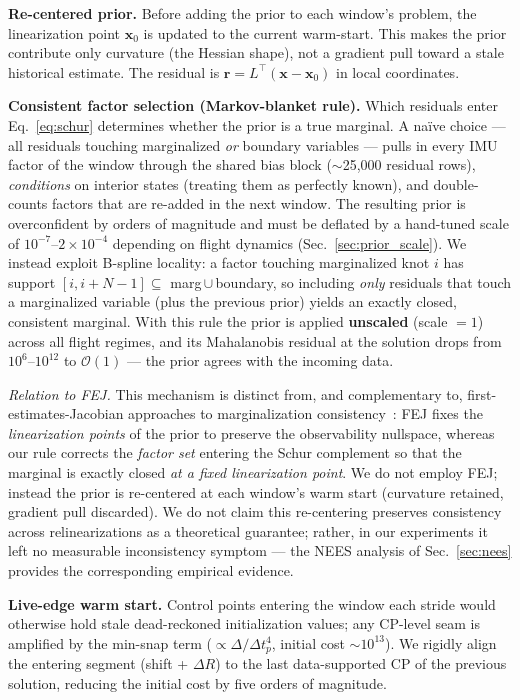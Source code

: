 \documentclass[conference]{IEEEtran}
\begin{document}
\textbf{Re-centered prior.}
Before adding the prior to each window's problem, the linearization
point $\mathbf{x}_0$ is updated to the current warm-start.  This
makes the prior contribute only curvature (the Hessian shape), not a
gradient pull toward a stale historical estimate.  The residual is
$\mathbf{r} = L^{\top}(\mathbf{x} - \mathbf{x}_0)$ in local
coordinates.

\textbf{Consistent factor selection (Markov-blanket rule).}
Which residuals enter Eq.~\eqref{eq:schur} determines whether the
prior is a true marginal.  A na\"ive choice --- all residuals touching
marginalized \emph{or} boundary variables --- pulls in every IMU factor
of the window through the shared bias block ($\sim$25{,}000 residual
rows), \emph{conditions} on interior states (treating them as perfectly
known), and double-counts factors that are re-added in the next window.
The resulting prior is overconfident by orders of magnitude and must be
deflated by a hand-tuned scale of $10^{-7}$--$2{\times}10^{-4}$
depending on flight dynamics (Sec.~\ref{sec:prior_scale}).
We instead exploit B-spline locality: a factor touching marginalized
knot $i$ has support $[i, i{+}N{-}1] \subseteq$
marg\,$\cup$\,boundary, so including \emph{only} residuals that touch a
marginalized variable (plus the previous prior) yields an exactly
closed, consistent marginal.  With this rule the prior is applied
\textbf{unscaled} (scale $=1$) across all flight regimes, and its
Mahalanobis residual at the solution drops from $10^{6}$--$10^{12}$
to $\mathcal{O}(1)$ --- the prior agrees with the incoming data.

\emph{Relation to FEJ.}  This mechanism is distinct from, and
complementary to, first-estimates-Jacobian approaches to
marginalization consistency~\cite{dongsi2012consistency}: FEJ fixes
the \emph{linearization points} of the prior to preserve the
observability nullspace, whereas our rule corrects the
\emph{factor set} entering the Schur complement so that the marginal
is exactly closed \emph{at a fixed linearization point}.  We do not
employ FEJ; instead the prior is re-centered at each window's warm
start (curvature retained, gradient pull discarded).  We do not claim
this re-centering preserves consistency across relinearizations as a
theoretical guarantee; rather, in our experiments it left no measurable
inconsistency symptom --- the NEES analysis of
Sec.~\ref{sec:nees} provides the corresponding empirical evidence.

\textbf{Live-edge warm start.}
Control points entering the window each stride would otherwise hold
stale dead-reckoned initialization values; any CP-level seam is
amplified by the min-snap term ($\propto \Delta/\Delta t_p^4$, initial
cost $\sim$$10^{13}$).  We rigidly align the entering segment (shift +
$\Delta R$) to the last data-supported CP of the previous solution,
reducing the initial cost by five orders of magnitude.
\end{document}
